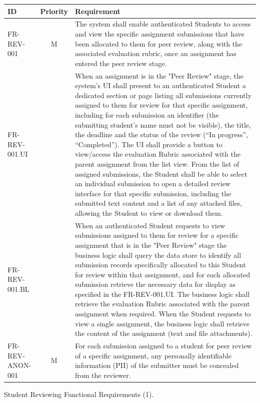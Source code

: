     \begin{tabular}{|l|c|p{10cm}|}
        \hline
        \textbf{ID} & \textbf{Priority} & \textbf{Requirement} \\
        \hline
        FR-REV-001 & M & The system shall enable authenticated Students to access and view the specific assignment submissions that have been allocated to them for peer review, along with the associated evaluation rubric, once an assignment has entered the peer review stage. \\
        \quad FR-REV-001.UI &  & \quad When an assignment is in the "Peer Review" stage, the system's UI shall present to an authenticated Student a dedicated section or page listing all submissions currently assigned to them for review for that specific assignment, including for each submission an identifier (the submitting student’s name must not be visible), the title, the deadline and the status of the review (“In progress”, “Completed”). The UI shall provide a button to view/access the evaluation Rubric associated with the parent assignment from the list view. From the list of assigned submissions, the Student shall be able to select an individual submission to open a detailed review interface for that specific submission, including the submitted text content and a list of any attached files, allowing the Student to view or download them. \\
        \quad FR-REV-001.BL &  & \quad When an authenticated Student requests to view submissions assigned to them for review for a specific assignment that is in the "Peer Review" stage the business logic shall query the data store to identify all submission records specifically allocated to this Student for review within that assignment, and for each allocated submission retrieve the necessary data for display as specified in the FR-REV-001.UI. The business logic shall retrieve the evaluation Rubric associated with the parent assignment when required. When the Student requests to view a single assignment, the business logic shall retrieve the content of the assignment (text and file attachments). \\
        \hline
        FR-REV-ANON-001 & M & For each submission assigned to a student for peer review of a specific assignment, any personally identifiable information (PII) of the submitter must be concealed from the reviewer. \\
        \hline
    \end{tabular}
\begin{table}[h]
    \centering
    \caption{Student Reviewing Functional Requirements (1).}
    \label{tab:StudentReviewingFR1}
\end{table}

